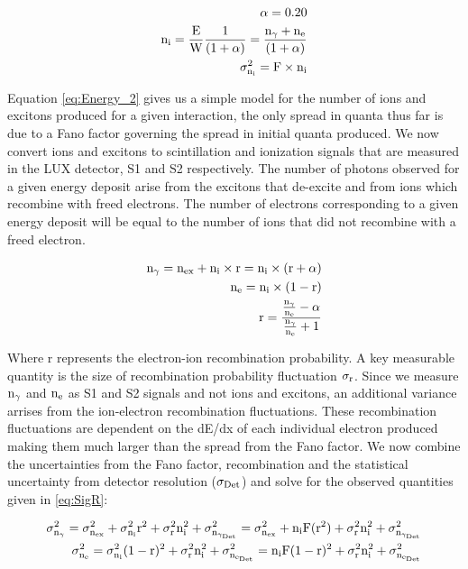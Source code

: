 \begin{equation}
\begin{split}
\rm \alpha = 0.20\\
\rm  n_i = \frac{E}{W} \frac{1}{(1+\alpha)} =  \frac{n_\gamma + n_e}{(1+\alpha)}  \\ %
\rm \sigma_{n_i}^2  = F \times n_i
\label{eq:Energy_2}
\end{split}
\end{equation}

Equation \ref{eq:Energy_2} gives us a simple model for the number of ions and excitons produced for a given interaction, the only spread in quanta thus far is due to a Fano factor governing the spread in initial quanta produced. We now convert ions and excitons to scintillation and ionization signals that are measured in the LUX detector, S1  and S2 respectively. The number of photons observed for a given energy deposit arise from the excitons that de-excite and from ions which recombine with freed electrons. The number of electrons corresponding to a given energy deposit will be equal to the number of ions that did not recombine with a freed electron. 

\begin{equation}
\begin{split}
\rm  n_\gamma = n_{ex} + n_i\times r = n_i\times (r+\alpha) \\
\rm  n_e = n_i\times (1-r)\\
\rm r= \frac{\frac{n_\gamma}{n_e}-\alpha}{\frac{n_\gamma}{n_e} + 1}
\label{eq:Quanta}
\end{split}
\end{equation}

Where r represents the electron-ion recombination probability. A key measurable quantity is the size of recombination probability fluctuation $\rm \sigma_r$. Since we measure $\rm n_\gamma$ and $\rm n_e$ as S1 and S2 signals and not ions and excitons, an additional variance arrises from the ion-electron recombination fluctuations. These recombination fluctuations are dependent on the dE/dx of each individual electron produced making them much larger than the spread from the Fano factor. We now combine the uncertainties from the Fano factor, recombination and the statistical uncertainty from detector resolution ($\rm\sigma_{Det}$) and solve for the observed quantities given in \ref{eq:SigR}:

\begin{equation}
\begin{split}
\rm \sigma_{n_\gamma}^2  =\sigma_{n_{ex}}^2 + \sigma_{n_i}^2 r^2 +  \sigma_{r}^2 n_i^2 +\sigma_{n_{\gamma_{Det}}}^2 = \sigma_{n_{ex}}^2 + n_iF(r^2) + \sigma_{r}^2 n_i^2 + \sigma_{n_{\gamma_{Det}}}^2 \\
\rm \sigma_{n_e}^2  = \sigma_{n_i}^2 (1-r)^2 +  \sigma_{r}^2 n_i^2 +\sigma_{n_{e_{Det}}}^2= n_iF(1-r)^2+ \sigma_{r}^2 n_i^2 +\sigma_{n_{e_{Det}}}^2
\label{eq:SigR}
\end{split}
\end{equation}


